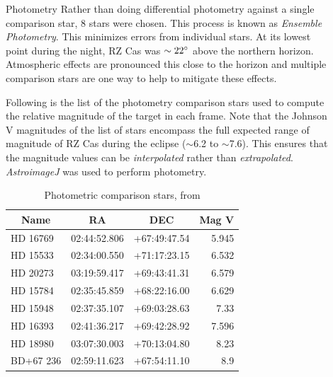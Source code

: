 \documentclass[final]{beamer}
\newcommand\mc[1]{\multicolumn{1}{c}{#1}} %
\newlength{\sepwidth}
\newlength{\colwidth}
\newcommand{\separatorcolumn}{\begin{column}{\sepwidth}\end{column}}
\begin{document}
\begin{frame}[t]
\begin{columns}[t]
\begin{column}{\colwidth}
\end{column}

\separatorcolumn

\begin{column}{\colwidth}

  \begin{block}{Photometry}
    Rather than doing differential photometry against a single comparison star, 8 stars
    were chosen. This process is known as \textit{Ensemble Photometry}. This minimizes 
    errors from individual stars. At its lowest point during the night, RZ Cas was 
    $\sim22\degree$ above the northern horizon.
    Atmospheric effects are pronounced this close to the horizon and multiple comparison
    stars are one way to help to mitigate these effects.

    Following is the list of the photometry comparison stars used to compute the 
    relative magnitude of the target in each frame. Note that the Johnson V magnitudes 
    of the list of stars encompass the full expected range of magnitude of RZ Cas 
    during the eclipse ($\sim$6.2 to $\sim$7.6). This ensures that the magnitude 
    values can be \textit{interpolated} rather than \textit{extrapolated}. 
    \textit{AstroimageJ} was used to perform photometry.

    \begin{table}
      \setlength{\tabcolsep}{1em} %
      \centering
        \begin{tabular}{l c c *{1}{d{4.3}} }
        \toprule
          \mc{\textbf{Name}} & \mc{\textbf{RA}} & \mc{\textbf{DEC}} & \mc{\textbf{Mag V}} \\
        \midrule
          HD 16769  & 02:44:52.806 & +67:49:47.54 & 5.945 \\
          HD 15533  & 02:34:00.550 & +71:17:23.15 & 6.532 \\
          HD 20273  & 03:19:59.417 & +69:43:41.31 & 6.579 \\
          HD 15784  & 02:35:45.859 & +68:22:16.00 & 6.629 \\
          HD 15948  & 02:37:35.107 & +69:03:28.63 & 7.33  \\
          HD 16393  & 02:41:36.217 & +69:42:28.92 & 7.596 \\
          HD 18980  & 03:07:30.003 & +70:13:04.80 & 8.23  \\
          BD+67 236 & 02:59:11.623 & +67:54:11.10 & 8.9   \\
        \bottomrule
      \end{tabular}
      \caption{Photometric comparison stars, from \cite{2000A&AS..143....9W}}
    \end{table}


\end{block}
\end{column}
\end{columns}
\end{frame}
\end{document}
